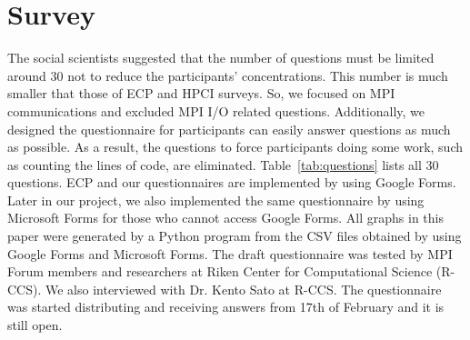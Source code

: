 \documentclass[conference,10pt,letterpaper]{IEEEtran}
\begin{document}
\section{Survey}
%
%
The social scientists suggested that the number of questions must be
limited around 30 not to reduce the participants' concentrations.  
This number is much smaller that those of ECP and HPCI surveys. So, we
focused on MPI communications and excluded MPI I/O related
questions. Additionally, we designed the questionnaire for
participants can easily answer questions as much as possible. As a
result, the questions to force participants doing some work, such as
counting the lines of code, are eliminated. Table~\ref{tab:questions}
lists all 30 questions.
%
ECP and our questionnaires are implemented by using Google Forms. Later
in our project, we also implemented the same questionnaire by using
Microsoft Forms for those who cannot access Google Forms. All graphs
in this paper were generated by a Python program from the CSV files
obtained by using Google Forms and Microsoft Forms.
%
The draft questionnaire was tested by MPI Forum members and
researchers at Riken Center for Computational Science (R-CCS). We also
interviewed with Dr. Kento Sato at R-CCS.
The questionnaire was started distributing and receiving answers from
17th of February and it is still open. 
%
\end{document}
